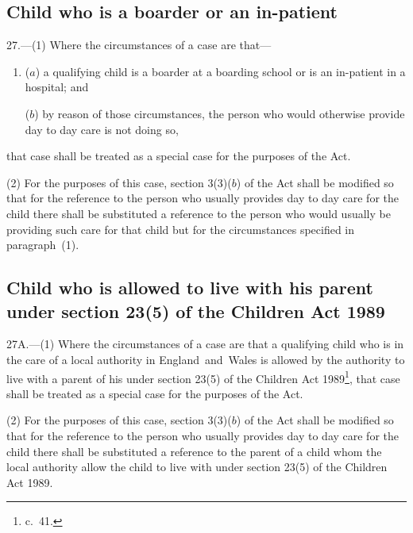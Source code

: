 \documentclass[12pt,a4paper]{article}
\begin{document}
\subsection[27. Child who is a boarder or an in-patient]{Child who is a boarder or an in-patient}

27.—(1) Where the circumstances of a case are that—
\begin{enumerate}\item[]
($a$) a qualifying child is a boarder at a boarding school or is an in-patient in a hospital; and

($b$) by reason of those circumstances, the person who would otherwise provide day to day care is not doing so,
\end{enumerate}
that case shall be treated as a special case for the purposes of the Act.

(2) For the purposes of this case, section 3(3)($b$) of the Act shall be modified so 
that %
for the reference to the person who usually provides day to day care for the child there shall be substituted a reference to the person who would usually be providing such care for that child but for the circumstances specified in paragraph~(1).


\subsection[27A. Child who is allowed to live with his parent under section 23(5) of the Children Act 1989]{Child who is allowed to live with his parent under section 23(5) of the Children Act 1989}

27A.—(1) Where the circumstances of a case are that a qualifying child who is in the care of a local authority in England~and~Wales is allowed by the authority to live with a parent of his under section 23(5) of the Children Act 1989\footnote{ c.~41.}, that case shall be treated as a special case for the purposes of the Act.

(2) For the purposes of this case, section 3(3)($b$) of the Act shall be modified so that for the reference to the person who usually provides day to day care for the child there shall be substituted a reference to the parent of a child whom the local authority allow the child to live with under section 23(5) of the Children Act 1989.
\end{document}
